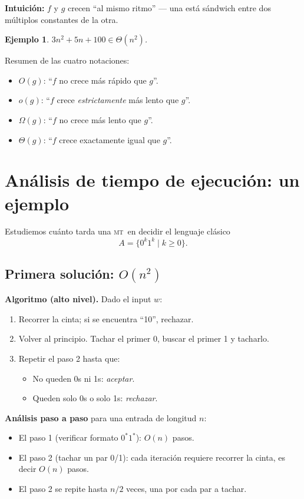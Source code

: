 \documentclass[11pt,a4paper]{article}
\theoremstyle{definicion}
\newtheorem{ejemplo}[definicion]{Ejemplo}
\newcommand{\MT}{\textsc{mt}}
\begin{document}
\textbf{Intuición:} $f$ y $g$ crecen ``al mismo ritmo'' --- una está sándwich entre dos múltiplos constantes de la otra.

\begin{ejemplo}
$3n^2 + 5n + 100 \in \Theta(n^2)$.
\end{ejemplo}

\begin{idea}
Resumen de las cuatro notaciones:
\begin{itemize}
    \item $O(g)$: ``$f$ no crece más rápido que $g$''.
    \item $o(g)$: ``$f$ crece \emph{estrictamente} más lento que $g$''.
    \item $\Omega(g)$: ``$f$ no crece más lento que $g$''.
    \item $\Theta(g)$: ``$f$ crece exactamente igual que $g$''.
\end{itemize}
\end{idea}

\section{Análisis de tiempo de ejecución: un ejemplo}

Estudiemos cuánto tarda una \MT\ en decidir el lenguaje clásico
\[
A = \{ 0^k 1^k \mid k \geq 0 \}.
\]

\subsection{Primera solución: $O(n^2)$}

\textbf{Algoritmo (alto nivel).} Dado el input $w$:
\begin{enumerate}
    \item Recorrer la cinta; si se encuentra ``10'', rechazar.
    \item Volver al principio. Tachar el primer 0, buscar el primer 1 y tacharlo.
    \item Repetir el paso 2 hasta que:
    \begin{itemize}
        \item No queden 0s ni 1s: \emph{aceptar}.
        \item Queden solo 0s o solo 1s: \emph{rechazar}.
    \end{itemize}
\end{enumerate}

\textbf{Análisis paso a paso} para una entrada de longitud $n$:
\begin{itemize}
    \item El paso 1 (verificar formato $0^*1^*$): $O(n)$ pasos.
    \item El paso 2 (tachar un par 0/1): cada iteración requiere recorrer la cinta, es decir $O(n)$ pasos.
    \item El paso 2 se repite hasta $n/2$ veces, una por cada par a tachar.
\end{itemize}
\end{document}
